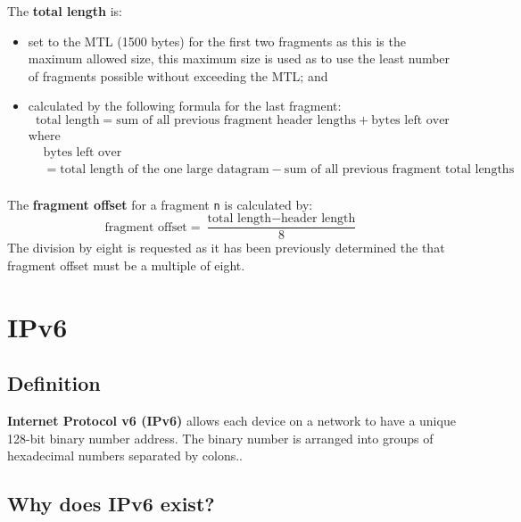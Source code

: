 \documentclass[a4paper]{systems-software}
\begin{document}
The \textbf{total length} is:
\begin{itemize}
	\item set to the MTL (1500 bytes) for the first two fragments as this is the maximum allowed size, this maximum size is used as to use the least number of fragments possible without exceeding the MTL; and
	\item calculated by the following formula for the last fragment:
	\begin{equation*}
	\text{total length} = \text{sum of all previous fragment header lengths} + \text{bytes left over}
	\end{equation*}
	where
	\begin{equation*}
		\begin{aligned}
			& \text{bytes left over} \\
			& = \text{total length of the one large datagram} - \text{sum of all previous fragment total lengths} \\
		\end{aligned}
	\end{equation*}
\end{itemize}

The \textbf{fragment offset} for a fragment \texttt{n} is calculated by:
\begin{equation*}
\text{fragment offset} = \dfrac{\text{total length} - \text{header length}}{8} 
\end{equation*}
The division by eight is requested as it has been previously determined the that fragment offset must be a multiple of eight.


\newpage

\section*{IPv6}

\subsection*{Definition}

\textbf{Internet Protocol v6 (IPv6)} allows each device on a network to have a unique 128-bit binary number address. The binary number is arranged into groups of hexadecimal numbers separated by colons..


\subsection*{Why does IPv6 exist?}
\end{document}
